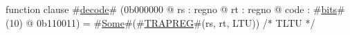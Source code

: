 function clause #\hyperref[zdecode]{decode}# (0b000000 @ rs : regno @ rt : regno @ code : #\hyperref[zbits]{bits}#(10) @ 0b110011) =
  #\hyperref[zSome]{Some}#(#\hyperref[zTRAPREG]{TRAPREG}#(rs, rt, LTU)) /* TLTU */
